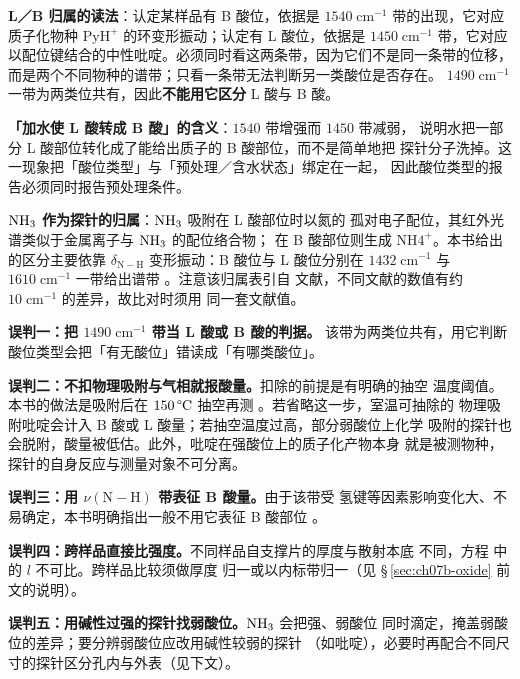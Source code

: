 \begin{infer}
\textbf{L／B 归属的读法}：认定某样品有 B 酸位，依据是
$1540\;\mathrm{cm^{-1}}$ 带的出现，它对应质子化物种 $\mathrm{PyH^{+}}$
的环变形振动；认定有 L 酸位，依据是 $1450\;\mathrm{cm^{-1}}$ 带，它对应
以配位键结合的中性吡啶。必须同时看这两条带，因为它们不是同一条带的位移，
而是两个不同物种的谱带；只看一条带无法判断另一类酸位是否存在。
$1490\;\mathrm{cm^{-1}}$ 一带为两类位共有，因此\textbf{不能用它区分}
L 酸与 B 酸。

\textbf{「加水使 L 酸转成 B 酸」的含义}：$1540$ 带增强而 $1450$ 带减弱，
说明水把一部分 L 酸部位转化成了能给出质子的 B 酸部位，而不是简单地把
探针分子洗掉。这一现象把「酸位类型」与「预处理／含水状态」绑定在一起，
因此酸位类型的报告必须同时报告预处理条件。

\textbf{$\ce{NH3}$ 作为探针的归属}：$\ce{NH3}$ 吸附在 L 酸部位时以氮的
孤对电子配位，其红外光谱类似于金属离子与 $\ce{NH3}$ 的配位络合物；
在 B 酸部位则生成 $\mathrm{NH4^{+}}$。本书给出的区分主要依靠
$\delta_{\mathrm{N{-}H}}$ 变形振动：B 酸位与 L 酸位分别在
$1432\;\mathrm{cm^{-1}}$ 与 $1610\;\mathrm{cm^{-1}}$ 一带给出谱带
。注意该归属表引自
文献，不同文献的数值有约 $10\;\mathrm{cm^{-1}}$ 的差异，故比对时须用
同一套文献值。
\end{infer}

\begin{pitfall}
\textbf{误判一：把 $1490\;\mathrm{cm^{-1}}$ 带当 L 酸或 B 酸的判据。}
该带为两类位共有，用它判断酸位类型会把「有无酸位」错读成「有哪类酸位」。

\textbf{误判二：不扣物理吸附与气相就报酸量。}扣除的前提是有明确的抽空
温度阈值。本书的做法是吸附后在 $150\,\degC$ 抽空再测
。若省略这一步，室温可抽除的
物理吸附吡啶会计入 B 酸或 L 酸量；若抽空温度过高，部分弱酸位上化学
吸附的探针也会脱附，酸量被低估。此外，吡啶在强酸位上的质子化产物本身
就是被测物种，探针的自身反应与测量对象不可分离。

\textbf{误判三：用 $\nu(\mathrm{N{-}H})$ 带表征 B 酸量。}由于该带受
氢键等因素影响变化大、不易确定，本书明确指出一般不用它表征 B 酸部位
。

\textbf{误判四：跨样品直接比强度。}不同样品自支撑片的厚度与散射本底
不同，方程  中的 $l$ 不可比。跨样品比较须做厚度
归一或以内标带归一（见 \S\,\ref{sec:ch07b-oxide} 前文的说明）。

\textbf{误判五：用碱性过强的探针找弱酸位。}$\ce{NH3}$ 会把强、弱酸位
同时滴定，掩盖弱酸位的差异；要分辨弱酸位应改用碱性较弱的探针
（如吡啶），必要时再配合不同尺寸的探针区分孔内与外表（见下文）。
\end{pitfall}

